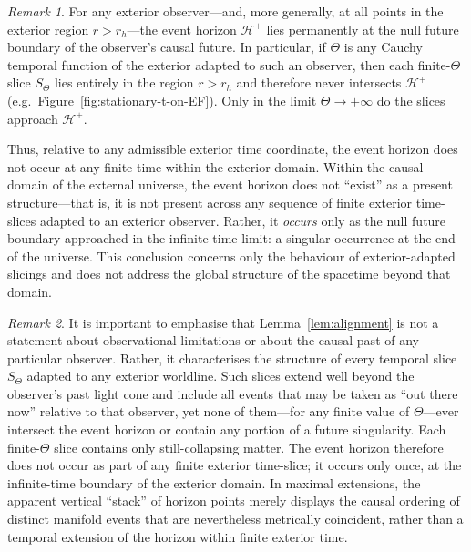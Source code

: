 \documentclass[11pt,a4paper]{article}
\theoremstyle{plain}
\theoremstyle{remark}
\newtheorem{remark}{Remark}
\begin{document}
\begin{remark}
For any exterior observer---and, more generally, at all points in the exterior region $r>r_h$---the event horizon $\mathcal{H}^+$ lies permanently at the null future boundary of the observer's causal future. In particular, if $\Theta$ is any Cauchy temporal function of the exterior adapted to such an observer, then each finite-$\Theta$ slice $S_\Theta$ lies entirely in the region $r>r_h$ and therefore never intersects $\mathcal{H}^+$ (e.g.~Figure~\ref{fig:stationary-t-on-EF}). Only in the limit $\Theta \to +\infty$ do the slices approach $\mathcal{H}^+$.

Thus, relative to any admissible exterior time coordinate, the event horizon does not occur at any finite time within the exterior domain. Within the causal domain of the external universe, the event horizon does not ``exist'' as a present structure---that is, it is not present across any sequence of finite exterior time-slices adapted to an exterior observer. Rather, it \textit{occurs} only as the null future boundary approached in the infinite-time limit: a singular occurrence at the end of the universe. This conclusion concerns only the behaviour of exterior-adapted slicings and does not address the global structure of the spacetime beyond that domain.
\end{remark}

\begin{remark}
It is important to emphasise that Lemma~\ref{lem:alignment} is not a statement about observational limitations or about the causal past of any particular observer. Rather, it characterises the structure of every temporal slice $S_\Theta$ adapted to any exterior worldline. Such slices extend well beyond the observer's past light cone and include all events that may be taken as ``out there now'' relative to that observer, yet none of them---for any finite value of $\Theta$---ever intersect the event horizon or contain any portion of a future singularity. Each finite-$\Theta$ slice contains only still-collapsing matter. The event horizon therefore does not occur as part of any finite exterior time-slice; it occurs only once, at the infinite-time boundary of the exterior domain. In maximal extensions, the apparent vertical ``stack'' of horizon points merely displays the causal ordering of distinct manifold events that are nevertheless metrically coincident, rather than a temporal extension of the horizon within finite exterior time.
\end{remark}
\end{document}
